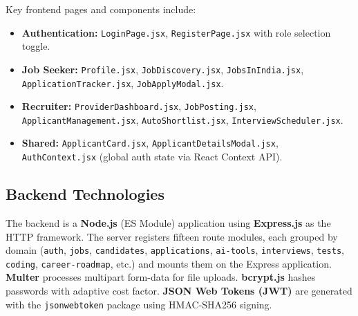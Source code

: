 \documentclass[12pt,a4paper]{report}
\begin{document}
Key frontend pages and components include:
\begin{itemize}[leftmargin=*, itemsep=2pt]
    \item \textbf{Authentication:} \texttt{LoginPage.jsx}, \texttt{RegisterPage.jsx} with role selection toggle.
    \item \textbf{Job Seeker:} \texttt{Profile.jsx}, \texttt{JobDiscovery.jsx}, \texttt{JobsInIndia.jsx}, \texttt{ApplicationTracker.jsx}, \texttt{JobApplyModal.jsx}.
    \item \textbf{Recruiter:} \texttt{ProviderDashboard.jsx}, \texttt{JobPosting.jsx}, \texttt{ApplicantManagement.jsx}, \texttt{AutoShortlist.jsx}, \texttt{InterviewScheduler.jsx}.
    \item \textbf{Shared:} \texttt{ApplicantCard.jsx}, \texttt{ApplicantDetailsModal.jsx}, \texttt{AuthContext.jsx} (global auth state via React Context API).
\end{itemize}

\subsection{Backend Technologies}
The backend is a \textbf{Node.js} (ES Module) application using \textbf{Express.js} as the HTTP framework. The server registers fifteen route modules, each grouped by domain (\texttt{auth}, \texttt{jobs}, \texttt{candidates}, \texttt{applications}, \texttt{ai-tools}, \texttt{interviews}, \texttt{tests}, \texttt{coding}, \texttt{career-roadmap}, etc.) and mounts them on the Express application. \textbf{Multer} processes multipart form-data for file uploads. \textbf{bcrypt.js} hashes passwords with adaptive cost factor. \textbf{JSON Web Tokens (JWT)} are generated with the \texttt{jsonwebtoken} package using HMAC-SHA256 signing.
\end{document}
